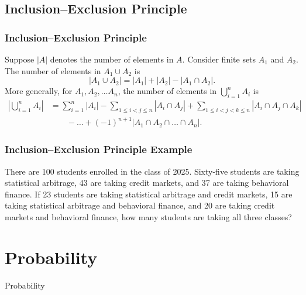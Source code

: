 \documentclass{beamer}
\begin{document}
\subsection{Inclusion--Exclusion Principle}

\begin{frame}
\frametitle{Inclusion--Exclusion Principle}

\begin{Theorem}
Suppose $|A|$ denotes the number of elements in $A$. Consider finite sets $A_1$ and $A_2$. The number of elements in $A_1\cup A_2$ is
$$
|A_1\cup A_2| = |A_1| + |A_2| - |A_1\cap A_2|.
$$
More generally, for $A_1, A_2,\ldots A_n$, the number of elements in $\displaystyle\bigcup_{i = 1}^n A_i$ is
\begin{align*}
\left|\bigcup_{i = 1}^n A_i\right| &= \sum_{i = 1}^n |A_i| - \sum_{1 \leq i < j \leq n} \left|A_i\cap A_j \right|+ \sum_{1\leq i < j < k\leq n} \left| A_i \cap A_j \cap A_k\right|\\
						&\qquad  - \ldots + (-1)^{n +1} \left|A_1\cap A_2\cap \ldots \cap A_n\right|.
\end{align*}
\end{Theorem}
\end{frame}

\begin{frame}[t]
\frametitle{Inclusion--Exclusion Principle Example}
\tiny
\begin{Example}
There are 100 students enrolled in the class of 2025. Sixty-five students are taking statistical arbitrage, 43 are taking credit markets, and 37 are taking behavioral finance. If 23 students are taking statistical arbitrage and credit markets, 15 are taking statistical arbitrage and behavioral finance, and 20 are taking credit markets and behavioral finance, how many students are taking all three classes?
\end{Example}
\end{frame}

\section{Probability}

\begin{frame}
\begin{center}
\Huge Probability
\end{center}
\end{frame}
\end{document}
